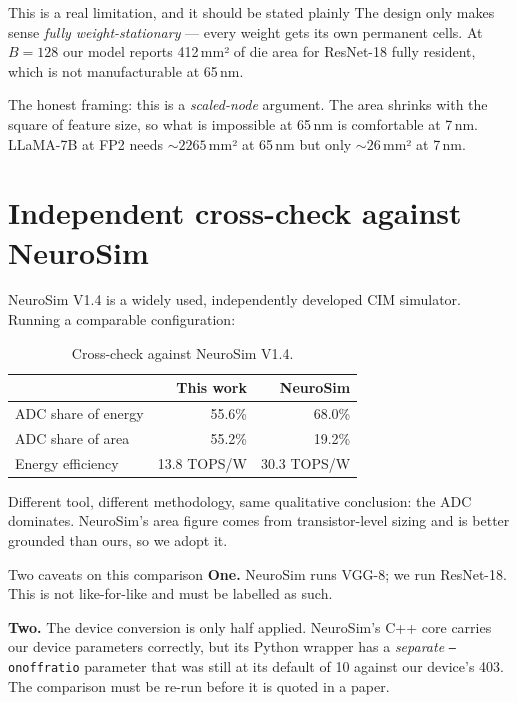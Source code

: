 \documentclass[11pt,a4paper]{report}
\begin{document}
\begin{warnbox}{This is a real limitation, and it should be stated plainly}
The design only makes sense \emph{fully weight-stationary} --- every weight
gets its own permanent cells. At $B=128$ our model reports 412\,mm² of die
area for ResNet-18 fully resident, which is not manufacturable at 65\,nm.

The honest framing: this is a \emph{scaled-node} argument. The area shrinks
with the square of feature size, so what is impossible at 65\,nm is
comfortable at 7\,nm. LLaMA-7B at FP2 needs ${\sim}2265$\,mm² at 65\,nm but
only ${\sim}26$\,mm² at 7\,nm.
\end{warnbox}

\section{Independent cross-check against NeuroSim}

NeuroSim V1.4 is a widely used, independently developed CIM simulator. Running
a comparable configuration:

\begin{table}[h]
\centering
\caption{Cross-check against NeuroSim V1.4.}
\begin{tabular}{lrr}
\toprule
 & This work & NeuroSim \\
\midrule
ADC share of energy & 55.6\% & 68.0\% \\
ADC share of area & 55.2\% & 19.2\% \\
Energy efficiency & 13.8 TOPS/W & 30.3 TOPS/W \\
\bottomrule
\end{tabular}
\end{table}

Different tool, different methodology, same qualitative conclusion: the ADC
dominates. NeuroSim's area figure comes from transistor-level sizing and is
better grounded than ours, so we adopt it.

\begin{warnbox}{Two caveats on this comparison}
\textbf{One.} NeuroSim runs VGG-8; we run ResNet-18. This is not like-for-like
and must be labelled as such.

\textbf{Two.} The device conversion is only half applied. NeuroSim's C++ core
carries our device parameters correctly, but its Python wrapper has a
\emph{separate} \texttt{--onoffratio} parameter that was still at its default
of 10 against our device's 403. The comparison must be re-run before it is
quoted in a paper.
\end{warnbox}
\end{document}
